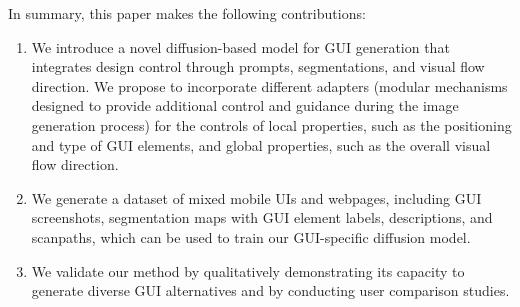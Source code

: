 \noindent In summary, this paper makes the following contributions:
\begin{enumerate}
\item We introduce a novel diffusion-based model for GUI generation that integrates design control through prompts, segmentations, and visual flow direction. We propose to incorporate different adapters (modular mechanisms designed to provide additional control and guidance during the image generation process) for the controls of local properties, such as the positioning and type of GUI elements, and global properties, such as the overall visual flow direction. 
\item We generate a dataset of mixed mobile UIs and webpages, including GUI screenshots, segmentation maps with GUI element labels, descriptions, and scanpaths, which can be used to train our GUI-specific diffusion model.
\item We validate our method by qualitatively demonstrating its capacity to generate diverse GUI alternatives and by conducting user comparison studies.
\end{enumerate}



